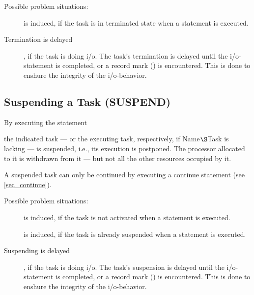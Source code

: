 Possible problem situations:
\begin{description}
\item[] is induced, if the task is in terminated state
 when a  statement is executed.
\item[Termination is delayed], if the task is doing i/o. The task's termination
is delayed until the i/o-statement is completed, or a record mark 
() 
is encountered.  This is done to enshure the integrity of the i/o-behavior.
\end{description}

\subsection{Suspending a Task (SUSPEND)}   %
\label{sec_suspend}

By executing the statement

\begin{grammarframe}

\end{grammarframe}

the indicated task --- or the executing task, respectively, if
Name$\S $Task is lacking --- is suspended, i.e., its execution is
postponed. The processor allocated to it is withdrawn from it --- but
not all the other resources occupied by it.

A suspended task can only be continued by executing a continue
statement (see \ref{sec_continue}).

Possible problem situations:
\begin{description}
\item[] is induced, if the task is not activated when 
a  statement is executed.
\item[] is induced, if the task is already suspended when
a  statement is executed.
\item[Suspending is delayed], if the task is doing i/o. The task's suspension
is delayed until the i/o-statement is completed, or a record mark () 
is encountered. This is done to enshure the integrity of the i/o-behavior.
\end{description}


